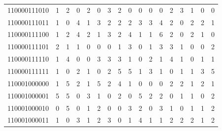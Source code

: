 \documentclass[10pt,a4paper]{article}
\begin{document}
\begin{longtable}{ |c|c|c|c|c|c|c|c|c|c|c|c|c|c|c|c|c| }
    110000111010              & 1                            & 2                                & 0                            & 2                              & 0   & 3   & 2   & 0   & 0   & 0   & 0   & 2   & 3   & 1   & 0   & 0   \\
    110000111011              & 1                            & 0                                & 4                            & 1                              & 3   & 2   & 2   & 2   & 3   & 3   & 4   & 2   & 0   & 2   & 2   & 1   \\
    110000111100              & 1                            & 2                                & 4                            & 2                              & 1   & 3   & 2   & 4   & 1   & 1   & 6   & 2   & 0   & 2   & 1   & 0   \\
    110000111101              & 2                            & 1                                & 1                            & 0                              & 0   & 0   & 1   & 3   & 0   & 1   & 3   & 3   & 1   & 0   & 0   & 2   \\
    110000111110              & 1                            & 4                                & 0                            & 0                              & 3   & 3   & 3   & 1   & 0   & 2   & 1   & 4   & 1   & 0   & 1   & 1   \\
    110000111111              & 1                            & 0                                & 2                            & 1                              & 0   & 2   & 5   & 5   & 1   & 3   & 1   & 0   & 1   & 1   & 3   & 5   \\
    110001000000              & 1                            & 5                                & 2                            & 1                              & 5   & 2   & 4   & 1   & 0   & 0   & 0   & 2   & 2   & 1   & 2   & 1   \\
    110001000001              & 5                            & 5                                & 0                            & 3                              & 1   & 0   & 2   & 0   & 5   & 2   & 2   & 0   & 1   & 1   & 0   & 2   \\
    110001000010              & 0                            & 5                                & 0                            & 1                              & 2   & 0   & 0   & 3   & 2   & 0   & 3   & 1   & 0   & 1   & 1   & 2   \\
    110001000011              & 1                            & 0                                & 3                            & 1                              & 2   & 3   & 0   & 1   & 4   & 1   & 1   & 2   & 2   & 2   & 1   & 2   \\

\end{longtable}
\end{document}
